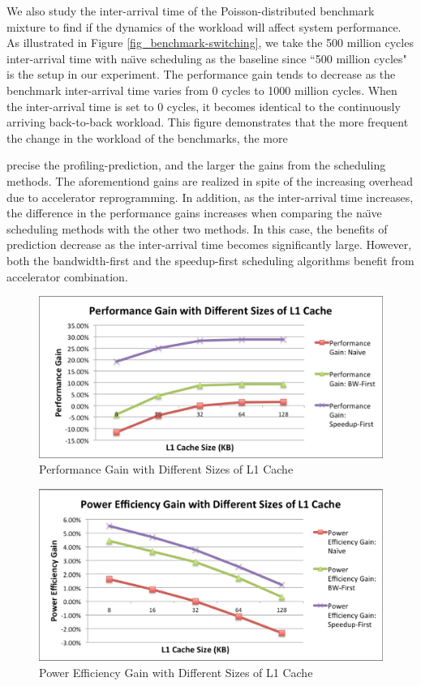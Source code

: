 We also study the inter-arrival time of the Poisson-distributed benchmark mixture to find if the dynamics of the workload will affect 
system performance. As illustrated in Figure \ref{fig_benchmark-switching}, we take the 500 million cycles inter-arrival time with na\"{\i}ve
 scheduling as the baseline since ``500 million cycles" is the setup in our experiment. The performance gain tends to decrease as 
the benchmark inter-arrival time varies from 0 cycles to 1000 million cycles. When the inter-arrival time is set to 0 cycles, it becomes
 identical to the continuously arriving back-to-back workload. This figure demonstrates that the more frequent the change in the workload of 
the benchmarks, the more\begin{flushright}

\end{flushright} precise the profiling-prediction, and the larger the gains from the scheduling methods. The aforementiond gains
are realized in spite of the increasing overhead due to accelerator reprogramming. In addition, as the inter-arrival time increases, 
the difference in the performance gains increases when comparing the na\"{\i}ve scheduling methods with the other two methods. 
In this case, the benefits of prediction decrease as the inter-arrival time becomes significantly large. However, both the bandwidth-first and
 the speedup-first scheduling algorithms benefit from accelerator combination. 

\begin{figure}
    \centering
    \includegraphics[width=4.5in]{L1-Cache-Performance}
    \caption{Performance Gain with Different Sizes of L1 Cache}
    \label{fig_l1_perf}
\end{figure}

\begin{figure}
    \centering
    \includegraphics[width=4.5in]{L1-Cache-Power}
    \caption{Power Efficiency Gain with Different Sizes of L1 Cache}
    \label{fig_l1_power}
\end{figure}

